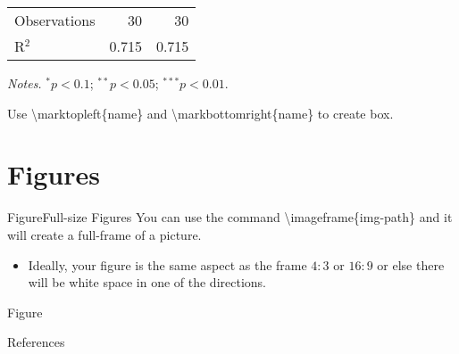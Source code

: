 \documentclass[aspectratio=43]{beamer}
\begin{document}
\begin{frame}
\begin{table}[!htbp]
\begin{adjustbox}{max width = \textwidth, width = 0.5\textwidth, center}
\begin{threeparttable}
\begin{tabular}{@{} l *{2}{r} @{}}
                \midrule 
                Observations & 30 & 30 \\ 
                R$^{2}$ & 0.715 & 0.715 \\ 
                \bottomrule

            \end{tabular} 
            \begin{tablenotes}
                \item \textit{Notes.} $^{*} p<0.1$; $^{**} p<0.05$; $^{***} p<0.01$.
            \end{tablenotes}
        \end{threeparttable}
    \end{adjustbox}
\end{table}

{\small
Use \textbackslash marktopleft\{name\} and \textbackslash markbottomright\{name\} to create box.
}
\end{frame}

\section{Figures}



\begin{frame}{Figure}{Full-size Figures}
    You can use the command \textbackslash imageframe\{img-path\} and it will create a full-frame of a picture. 
    
    \begin{itemize}
        \item Ideally, your figure is the same aspect as the frame $4:3$ or $16:9$ or else there will be white space in one of the directions.
    \end{itemize}
\end{frame}

\begin{frame}{Figure}{}
    \begin{center}
    \end{center}
\end{frame}

\begin{frame}[allowframebreaks]{References}
    \printbibliography
\end{frame}
\end{document}
